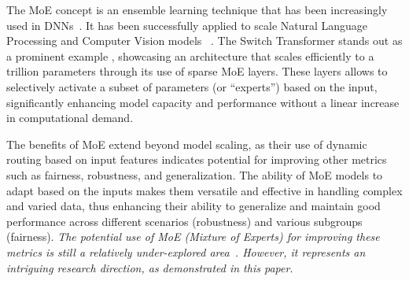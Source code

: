 The MoE concept is an ensemble learning technique that has been increasingly used in DNNs~\cite{rincy2020ensemble}. It has been successfully applied to scale Natural Language Processing and Computer Vision models ~\cite{du2022glam, riquelme2021scaling}. The Switch Transformer stands out as a prominent example \cite{fedus2022switch}, showcasing an architecture that scales efficiently to a trillion parameters through its use of sparse MoE layers. These layers allows to selectively activate a subset of parameters (or ``experts'') based on the input, significantly enhancing model capacity and performance without a linear increase in computational demand. 


The benefits of MoE extend beyond model scaling, as their use of dynamic routing based on input features indicates potential for improving other metrics such as fairness, robustness, and generalization. The ability of MoE models to adapt based on the inputs makes them versatile and effective in handling complex and varied data, thus enhancing their ability to generalize and maintain good performance across different scenarios (robustness) and various 
subgroups (fairness). \textit{The potential use of MoE (Mixture of Experts) for improving these metrics is still a relatively under-explored area~\cite{cui2022synergy, aimar2023balanced}. However, it represents an intriguing research direction, as demonstrated in this paper.}



